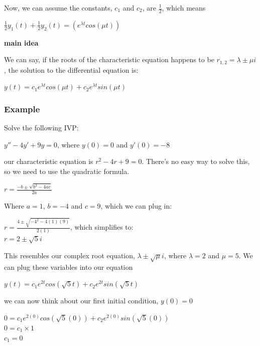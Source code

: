 \documentclass{article}
\begin{document}
Now, we can assume the constants, $c_1$ and $c_2$, are $\frac{1}{2}$, which means

\begin{center}
    $\frac{1}{2}y_1(t) + \frac{1}{2}y_2(t) = (e^{\lambda t} cos(\mu t))$ 
\end{center}

\textbf{main idea}

We can say, if the roots of the characteristic equation happens to be $r_{1,2} = \lambda \pm \mu i$, the solution to the differential equation is:

\begin{center}
    $y(t) = c_1 e^{\lambda t}cos(\mu t) + c_2 e^{\lambda t}sin(\mu t)$
\end{center}

\subsubsection{Example}

Solve the following IVP:

\begin{center}
    $y'' - 4y' + 9y = 0$, where $y(0) = 0$ and $y'(0) = -8$
\end{center}

our characteristic equation is $r^2 - 4r + 9 = 0$. There's no easy way to solve this, so we need to use the quadratic formula.

\begin{center}
    $r = \frac{-b \pm \sqrt{b^2 -4ac}}{2a}$
\end{center}

Where $a = 1$, $b = -4$ and $c = 9$, which we can plug in:

\begin{center}
    $r = \frac{4 \pm \sqrt{-4^2 -4(1)(9)}}{2(1)}$, which simplifies to: \\
    $r = 2 \pm \sqrt{5}i$
\end{center}

This resembles our complex root equation, $\lambda \pm \sqrt{\mu}i$, where $\lambda = 2$ and $\mu = 5$. We can plug these variables into our equation

\begin{center}
    $y(t) = c_1 e^{2 t}cos(\sqrt{5} t) + c_2 e^{2 t}sin(\sqrt{5} t)$
\end{center}

we can now think about our first initial condition, $y(0) = 0$


\begin{center}
    $0 = c_1 e^{2(0)}cos(\sqrt{5} (0)) + c_2 e^{2 (0)}sin(\sqrt{5} (0))$ \\
    $0 = c_1 \times 1$ \\
    $c_1 = 0$
\end{center}
\end{document}
